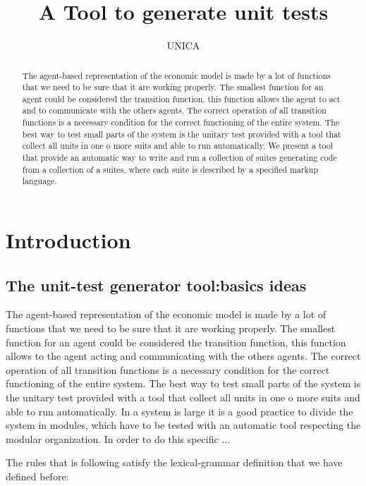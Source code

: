 \documentclass[a4paper,10pt]{article}
\title{A Tool to generate unit tests }
\author{UNICA}
\begin{document}
\maketitle



\begin{abstract} 
The agent-based representation of the economic model is made by a lot of functions that we need to be sure that it are working properly. The smallest function for an agent could be considered the transition function, this function allows the agent to act and to communicate with the others agents. The correct operation of all transition functions  is a necessary condition for the correct functioning of the entire system.
The best way to test small parts of the system is the unitary test provided with a tool that collect all units in one o more suits and able to run automatically. We present a tool that provide an automatic way to write and run a collection of suites generating code from a collection of a suites, where each suite is described by a specified markup language.
\end{abstract}
\tableofcontents

\section{Introduction}

\subsection{The unit-test generator tool:basics ideas}

The agent-based representation of the economic model is made by a lot of functions that we need to be sure that it are working properly. The smallest function for an agent could be considered the transition function, this function allows to the agent acting and communicating with the others agents. The correct operation of all transition functions is a necessary condition for the correct functioning of the entire system.
The best way to test small parts of the system is the unitary test provided with a tool that collect all units in one o more suits and able to run automatically. In a system is large it is a good practice to divide the system in modules, which have to be tested with an automatic tool respecting the modular organization. In order to do this specific ... 

%
The rules that is following satisfy the lexical-grammar definition that we have defined before:

\end{document}
